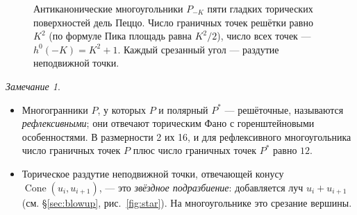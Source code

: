 \documentclass[11pt,a4paper]{article}
\theoremstyle{plain}
\theoremstyle{definition}
\theoremstyle{remark}
\newtheorem{remark}[theorem]{Замечание}
\newcommand{\PP}{\mathbb{P}}
\DeclareMathOperator{\Bl}{Bl}
\DeclareMathOperator{\Cone}{Cone}
\begin{document}
\begin{figure}[ht]
\centering
\newcommand{\polylat}{\foreach \x in {-1,...,2}\foreach \y in {-1,...,2}{\fill[gray!55] (\x,\y) circle (1pt);}}
\hfill
{}\hfill
{}\hfill
{}\hfill
{}
\caption{Антиканонические многоугольники $P_{-K}$ пяти гладких торических поверхностей дель Пеццо.
Число граничных точек решётки равно $K^2$ (по формуле Пика площадь равна $K^2/2$), число всех точек ---
$h^0(-K)=K^2+1$. Каждый срезанный угол --- раздутие неподвижной точки.}
\label{fig:polytopes}
\end{figure}

\begin{remark}
\begin{itemize}
\item Многогранники $P$, у которых $P$ и полярный $P^*$ --- решёточные, называются \emph{рефлексивными}; они
отвечают торическим Фано с горенштейновыми особенностями. В размерности 2 их 16, и для рефлексивного
многоугольника число граничных точек $P$ плюс число граничных точек $P^*$ равно $12$.
\item Торическое раздутие неподвижной точки, отвечающей конусу $\Cone(u_i,u_{i+1})$, --- это
\emph{звёздное подразбиение}: добавляется луч $u_i+u_{i+1}$ (см. \S\ref{sec:blowup}, рис.~\ref{fig:star}).
На многоугольнике это срезание вершины.
\end{itemize}
\end{remark}
\end{document}
